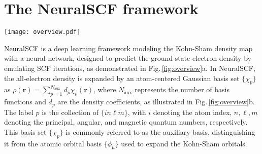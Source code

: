 \documentclass[%
reprint,
superscriptaddress,
bibnotes,
amsmath,amssymb,
aps,
floatfix, %
]{revtex4-2}
\begin{document}
\section{\label{sec:framework}The NeuralSCF framework}


\begin{figure*}[!ht]
  \texttt{[image: overview.pdf]}
  \caption{\textbf{Overview of NeuralSCF.} \textbf{(a)} A comparison of the workflow of standard Kohn-Sham DFT and NeuralSCF. NeuralSCF models the Kohn-Sham density map using an equivariant graph transformer. NeuralSCF's prediction of the ground-state electron density is defined by its fixed point, solved through self-consistent iterations aided by a density mixing scheme. Finally, ground state can be obtained from the predicted density with an extra Kohn-Sham step. \textbf{(b)} The electron density is represented by the expansion coefficients under a set of atom-centered Gaussian basis functions, which can be decomposed into atom-wise spherical tensors. \textbf{(c)} The two-stage training strategy of NeuralSCF. The explicit pre-training stage learns the Kohn-Sham density map from SCF trajectory data, while the implicit fine-tuning stage further aligns the model's fixed point with the self-consistent electron density via implicit differentiation.}
  \label{fig:overview}
\end{figure*}

\noindent NeuralSCF is a deep learning framework modeling the Kohn-Sham density map with a neural network, designed to predict the ground-state electron density by emulating SCF iterations, as demonstrated in Fig.\,\ref{fig:overview}a. In NeuralSCF, the all-electron density is expanded by an atom-centered Gaussian basis set $\{\chi_p\}$ as $\rho(\bm{r}) = \sum_{p=1}^{N_\text{aux}} d_p \chi_p(\bm{r})$, where $N_\text{aux}$ represents the number of basis functions and $d_p$ are the density coefficients, as illustrated in Fig.\,\ref{fig:overview}b. The label $p $ is the collection of $\{in\ell m\}$, with $i$ denoting the atom index, $n,\ell,m$ denoting the principal, angular, and magnetic quantum numbers, respectively. This basis set $\{\chi_p\}$ is commonly referred to as the auxiliary basis, distinguishing it from the atomic orbital basis $\{\phi_\mu\}$ used to expand the Kohn-Sham orbitals.
\end{document}
